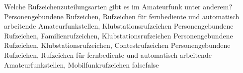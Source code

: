     {Welche Rufzeichenzuteilungsarten gibt es im Amateurfunk unter anderem?}
    {Personengebundene Rufzeichen, Rufzeichen für fernbediente und automatisch arbeitende Amateurfunkstellen, Klubstationsrufzeichen}
    {Personengebundene Rufzeichen, Familienrufzeichen, Klubstationsrufzeichen}
    {Personengebundene Rufzeichen, Klubstationsrufzeichen, Contestrufzeichen}
    {Personengebundene Rufzeichen, Rufzeichen für fernbediente und automatisch arbeitende Amateurfunkstellen, Mobilfunkrufzeichen}
    {false}{false}